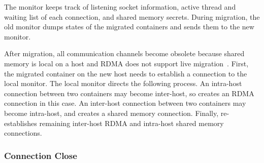 The monitor keeps track of listening socket information, active thread and waiting list of each connection, and shared memory secrets.
During migration, the old monitor dumps states of the migrated containers and sends them to the new monitor.

After migration, all communication channels become obsolete because shared memory is local on a host and RDMA does not support live migration~\cite{nsdi19freeflow,slim}.
First, the migrated container on the new host needs to establish a connection to the local monitor.
The local monitor directs the following process.
An intra-host connection between two containers may become inter-host, so \libipc{} creates an RDMA connection in this case.
An inter-host connection between two containers may become intra-host, and \libipc{} creates a shared memory connection.
Finally, \libipc{} re-establishes remaining inter-host RDMA and intra-host shared memory connections.





\subsubsection{Connection Close}
\label{subsubsec:fork_close}
\quad


